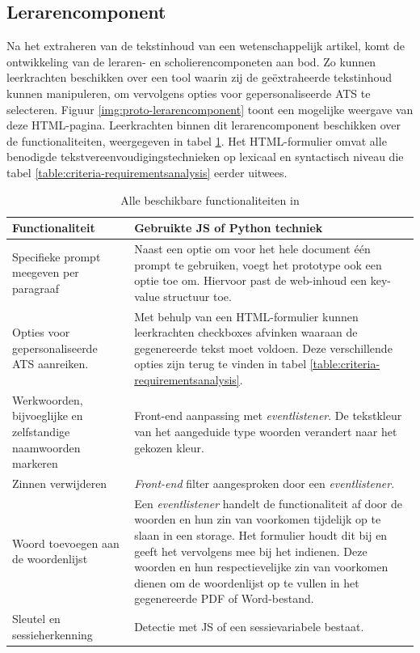 \subsection{Lerarencomponent}

Na het extraheren van de tekstinhoud van een wetenschappelijk artikel, komt de ontwikkeling van de leraren- en scholierencomponeten aan bod. Zo kunnen leerkrachten beschikken over een tool waarin zij de geëxtraheerde tekstinhoud kunnen manipuleren, om vervolgens opties voor gepersonaliseerde ATS te selecteren. Figuur \ref{img:proto-lerarencomponent} toont een mogelijke weergave van deze HTML-pagina. Leerkrachten binnen dit lerarencomponent beschikken over de functionaliteiten, weergegeven in tabel \ref{table:functionaliteiten-leerkrachten}. Het HTML-formulier omvat alle benodigde tekstvereenvoudigingstechnieken op lexicaal en syntactisch niveau die tabel \ref{table:criteria-requirementsanalysis} eerder uitwees. 

\begin{center}
	\begin{table}[H]
		\begin{tabular}{ | m{7cm} | m{8cm} | } 
			\hline
			\textbf{Functionaliteit} & Gebruikte JS of Python techniek \\
			\hline
			Specifieke prompt meegeven per paragraaf & Naast een optie om voor het hele document één prompt te gebruiken, voegt het prototype ook een optie toe om. Hiervoor past de web-inhoud een key-value structuur toe. \\
			\hline
			Opties voor gepersonaliseerde ATS aanreiken. & Met behulp van een HTML-formulier kunnen leerkrachten checkboxes afvinken waaraan de gegenereerde tekst moet voldoen. Deze verschillende opties zijn terug te vinden in tabel \ref{table:criteria-requirementsanalysis}. \\
			\hline
			Werkwoorden, bijvoeglijke en zelfstandige naamwoorden markeren & Front-end aanpassing met \textit{eventlistener}. De tekstkleur van het aangeduide type woorden verandert naar het gekozen kleur. \\
			\hline
			Zinnen verwijderen & \textit{Front-end} filter aangesproken door een \textit{eventlistener}. \\
			\hline
			Woord toevoegen aan de woordenlijst & Een \textit{eventlistener} handelt de functionaliteit af door de woorden en hun zin van voorkomen tijdelijk op te slaan in een storage. Het formulier houdt dit bij en geeft het vervolgens mee bij het indienen. Deze woorden en hun respectievelijke zin van voorkomen dienen om de woordenlijst op te vullen in het gegenereerde PDF of Word-bestand. \\ 
			\hline
			Sleutel en sessieherkenning & Detectie met JS of een sessievariabele bestaat. \\
			\hline 
		\end{tabular}
	\caption{Alle beschikbare functionaliteiten in }
	\label{table:functionaliteiten-leerkrachten}
	\end{table}
\end{center}

